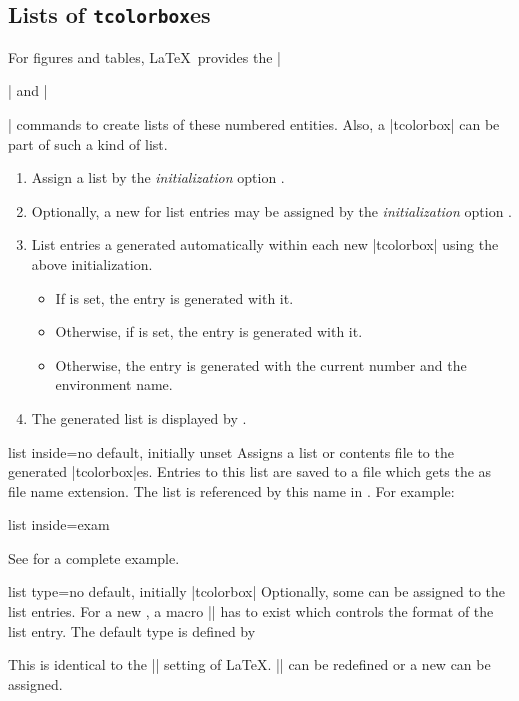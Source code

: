 \clearpage
\subsection{Lists of \texttt{tcolorbox}es}\label{sec:listsof}
For figures and tables, \LaTeX\ provides the |\listoffigures| and
|\listoftables| commands to create lists of these numbered entities.
Also, a |tcolorbox| can be part of such a kind of list.
\begin{enumerate}
\item Assign a list  by the \emph{initialization} option
  .
\item Optionally, a new  for list entries may be assigned
  by the \emph{initialization} option .
\item List entries a generated automatically within each new |tcolorbox|
  using the above initialization.
  \begin{itemize}
  \item If  is set, the entry is generated with it.
  \item Otherwise, if  is set, the entry is generated with it.
  \item Otherwise, the entry is generated with the current number and the environment name.
  \end{itemize}
\item The generated list is displayed by .
\end{enumerate}

\begin{newTcbKey}{list inside}{=}{no default, initially unset}
Assigns a list or contents file to the generated |tcolorbox|es.
Entries to this list are saved to a file which gets the  as
file name extension. The list is referenced by this name in
.
For example:
\begin{dispListing}
list inside=exam
\end{dispListing}
See  for a complete example.
\end{newTcbKey}


\begin{newTcbKey}{list type}{=}{no default, initially |tcolorbox|}
Optionally, some  can be assigned to the list entries.
For a new , a macro |\l@| has to exist which controls
the format of the list entry. The default type is defined by
\begin{dispListing}
\newcommand*\l@tcolorbox{\@dottedtocline{1}{1.5em}{2.3em}}
\end{dispListing}
This is identical to the |\l@section| setting of \LaTeX. |\l@tcolorbox| can
be redefined or a new  can be assigned.
\end{newTcbKey}


